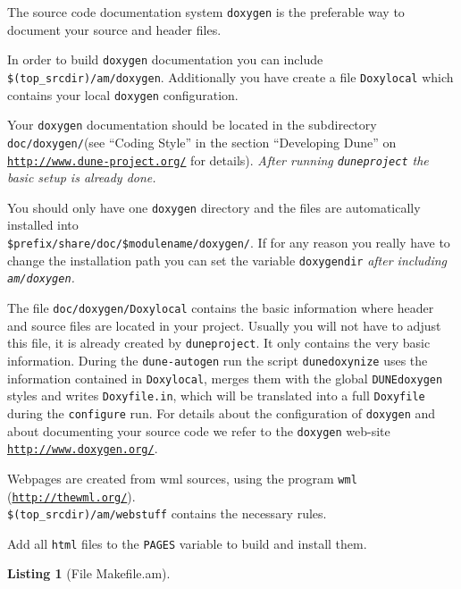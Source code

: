 \documentclass[11pt,a4paper,headinclude,footinclude,DIV16,normalheadings]{scrartcl}
\newtheorem{lst}{Listing}
\newcommand{\dune}{\texttt{DUNE}\xspace}
\newcommand{\configure}{\texttt{configure}\xspace}
\newcommand{\duneproject}{\texttt{duneproject}\xspace}
\begin{document}
The source code documentation system \texttt{doxygen}\xspace is the
preferable way to document your source and header files.

In order to build \texttt{doxygen} documentation you can include
\texttt{\$(top\_srcdir)/am/doxygen}. Additionally you have create a
file \texttt{Doxylocal} which contains your local \texttt{doxygen}
configuration.

Your \texttt{doxygen} documentation should be located in the
subdirectory \texttt{doc/doxygen/}\xspace (see ``Coding Style'' in the
section ``Developing Dune'' on
\texttt{\url{http://www.dune-project.org/}} for details). \em After
running \duneproject the basic setup is already done\em.

You should only have one \texttt{doxygen} directory and the files are
automatically installed into\\
\texttt{\$prefix/share/doc/\$modulename/doxygen/}. If for any reason
you really have to change the installation path you can set the
variable \texttt{doxygendir} \em after \em including \texttt{am/doxygen}.

The file \texttt{doc/doxygen/Doxylocal}\xspace contains the basic
information where header and source files are located in your
project. Usually you will not have to adjust this file, it is already
created by \duneproject. It only
contains the very basic information. During the \texttt{dune-autogen}\xspace
run the script \texttt{dunedoxynize}\xspace uses the information contained in
\texttt{Doxylocal}, merges them with the global \dune \texttt{doxygen}\xspace
styles and writes \texttt{Doxyfile.in}, which will be translated into a
full \texttt{Doxyfile}\xspace during the \configure run. For details about
the configuration of \texttt{doxygen}\xspace and about documenting your
source code we refer to the \texttt{doxygen}\xspace web-site
\texttt{\url{http://www.doxygen.org/}}.

Webpages are created from wml sources, using the program \texttt{wml}
(\texttt{\url{http://thewml.org/}}).\\
\texttt{\$(top\_srcdir)/am/webstuff} contains the necessary rules.

Add all \texttt{html} files to the \texttt{PAGES} variable to build
and install them.

\hspace*{-2ex}\begin{minipage}{\textwidth}
\begin{lst}[File Makefile.am] \mbox{}

\end{lst}
\end{minipage}
\end{document}
